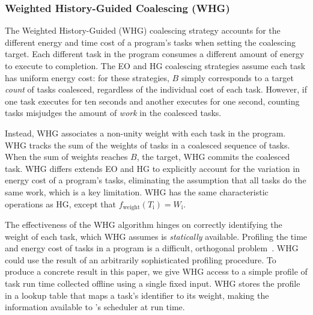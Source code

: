 \subsubsection{Weighted History-Guided Coalescing (WHG)}
\label{subsec:energyTaskAware}
%
The Weighted History-Guided (WHG) coalescing strategy accounts for the
different energy and time cost of a program's tasks when setting the coalescing
target.
%
Each different task in the program consumes a different amount of energy to
execute to completion.  
%
The EO and HG coalescing strategies assume each task has uniform energy cost:
for these strategies, $B$ simply corresponds to a target {\em count} of tasks
coalesced, regardless of the individual cost of each task.
%
However, if one task executes for ten seconds and another executes for one
second, counting tasks misjudges the amount of {\em work} in the coalesced
tasks.

Instead, WHG associates a non-unity weight with each task in the program. 
%
WHG tracks the sum of the weights of tasks in a coalesced sequence of tasks.
%
When the sum of weights reaches $B$, the target, WHG commits the coalesced
task.
%
WHG differs extends EO and HG to explicitly account for the variation in energy
cost of a program's tasks, eliminating the assumption that all tasks do the
same work, which is a key limitation.
%
WHG has the same characteristic operations as HG, except that
$f_\text{weight}(T_\text{i}) = W_\text{i}$.

The effectiveness of the WHG algorithm hinges on correctly identifying the
weight of each task, which WHG assumes is {\em statically} available.
%
Profiling the time and energy cost of tasks in a program is a difficult,
orthogonal problem~\cite{cleancut_2018,baghsorkhi_cgo_2018}.
%
WHG could use the result of an arbitrarily sophisticated profiling procedure.
%
To produce a concrete result in this paper, we give WHG access to a simple
profile of task run time collected offline using a single fixed input.
%
WHG stores the profile in a lookup table that maps a task's identifier to its
weight, making the information available to \sys's scheduler at run time.